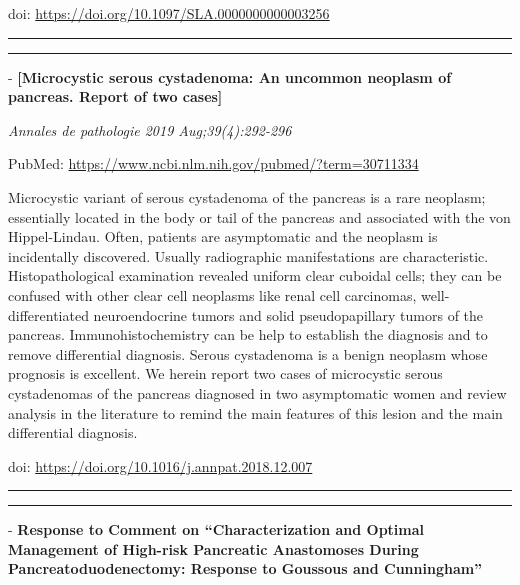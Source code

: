 \documentclass[]{article}
\begin{document}
doi: \url{https://doi.org/10.1097/SLA.0000000000003256}

{}

{}

\begin{center}\rule{0.5\linewidth}{\linethickness}\end{center}

\begin{center}\rule{0.5\linewidth}{\linethickness}\end{center}

 - \textbf{{[}Microcystic serous cystadenoma: An uncommon neoplasm of
pancreas. Report of two cases{]}}

\emph{Annales de pathologie 2019 Aug;39(4):292-296}

PubMed: \url{https://www.ncbi.nlm.nih.gov/pubmed/?term=30711334}

Microcystic variant of serous cystadenoma of the pancreas is a rare
neoplasm; essentially located in the body or tail of the pancreas and
associated with the von Hippel-Lindau. Often, patients are asymptomatic
and the neoplasm is incidentally discovered. Usually radiographic
manifestations are characteristic. Histopathological examination
revealed uniform clear cuboidal cells; they can be confused with other
clear cell neoplasms like renal cell carcinomas, well-differentiated
neuroendocrine tumors and solid pseudopapillary tumors of the pancreas.
Immunohistochemistry can be help to establish the diagnosis and to
remove differential diagnosis. Serous cystadenoma is a benign neoplasm
whose prognosis is excellent. We herein report two cases of microcystic
serous cystadenomas of the pancreas diagnosed in two asymptomatic women
and review analysis in the literature to remind the main features of
this lesion and the main differential diagnosis.

doi: \url{https://doi.org/10.1016/j.annpat.2018.12.007}

{}

{}

\begin{center}\rule{0.5\linewidth}{\linethickness}\end{center}

\begin{center}\rule{0.5\linewidth}{\linethickness}\end{center}

 - \textbf{Response to Comment on ``Characterization and Optimal
Management of High-risk Pancreatic Anastomoses During
Pancreatoduodenectomy: Response to Goussous and Cunningham''}
\end{document}
